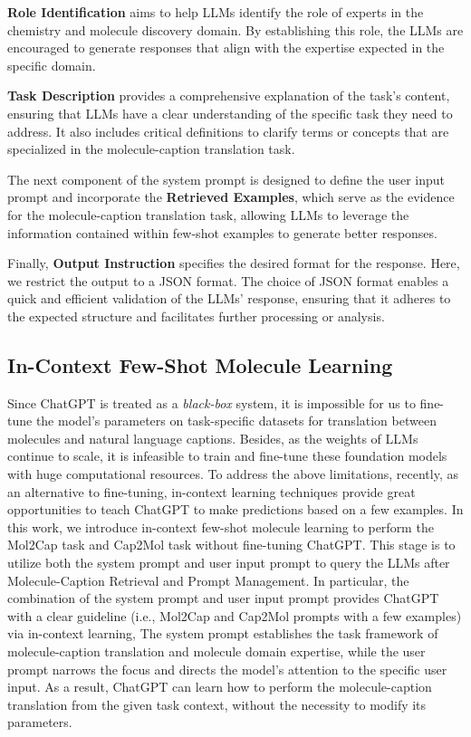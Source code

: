 \documentclass{article}
\theoremstyle{plain}
\theoremstyle{definition}
\theoremstyle{remark}
\begin{document}
\textbf{Role Identification} aims to help LLMs identify the role of experts in the chemistry and molecule discovery domain.
By establishing this role, the LLMs are encouraged to generate responses that align with the expertise expected in the specific domain.

\textbf{Task Description} provides a comprehensive explanation of the task's content, ensuring that LLMs have a clear understanding of the specific task they need to address.
It also includes critical definitions to clarify terms or concepts that are specialized in the molecule-caption translation task.

The next component of the system prompt is designed to define the user input prompt and incorporate the \textbf{Retrieved Examples}, which serve as the evidence for the molecule-caption translation task, allowing LLMs to leverage the information contained within few-shot examples to generate better responses.

Finally, \textbf{Output Instruction} specifies the desired format for the response. Here, we restrict the output to a JSON format. The choice of JSON format enables a quick and efficient validation of the LLMs' response, ensuring that it adheres to the expected structure and facilitates further processing or analysis.

\subsection{In-Context Few-Shot Molecule Learning}

Since ChatGPT is treated as a \emph{black-box} system, it is impossible for us to fine-tune the model's parameters on task-specific datasets for translation between molecules and natural language captions. Besides, as the weights of LLMs continue to scale, it is infeasible to train and fine-tune these foundation models with huge computational resources.
To address the above limitations, recently, as an alternative to fine-tuning, in-context learning techniques provide great opportunities to teach ChatGPT to make predictions based on a few examples.
In this work, we introduce in-context few-shot molecule learning to perform the Mol2Cap task and Cap2Mol task without fine-tuning ChatGPT. 
This stage is to utilize both the system prompt and user input prompt to query the LLMs after Molecule-Caption Retrieval and Prompt Management.
In particular, the combination of the system prompt and user input prompt provides ChatGPT with a clear guideline (i.e., Mol2Cap and Cap2Mol prompts with a few examples) via in-context learning, The system prompt establishes the task framework of molecule-caption translation and molecule domain expertise, while the user prompt narrows the focus and directs the model's attention to the specific user input. 
As a result, ChatGPT can learn how to perform the molecule-caption translation from the given task context, without the necessity to modify its parameters.
\end{document}
